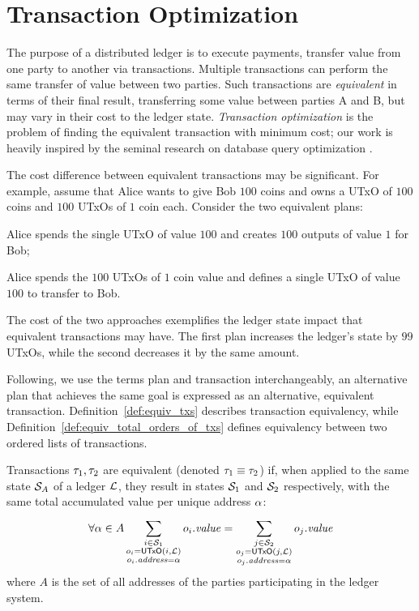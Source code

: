 \section{Transaction Optimization}\label{sec:tx_optimization}

The purpose of a distributed ledger is to execute payments, \ie transfer value
from one party to another via transactions.  Multiple transactions can perform
the same transfer of value between two parties. Such transactions are
\emph{equivalent} in terms of their final result, \ie transferring some value
between parties A and B, but may vary in their cost to the ledger state.
\emph{Transaction optimization} is the problem of finding the equivalent
transaction with minimum cost; our work is heavily inspired by the seminal
research on database query optimization \cite{ioannidis}.

The cost difference between equivalent transactions may be significant.
For example, assume that Alice wants to give Bob $100$ coins and owns a UTxO of
$100$ coins and $100$ UTxOs of $1$ coin each. Consider the two equivalent
plans:
\begin{inparaenum}[1)]
    \item Alice spends the single UTxO of value $100$ and
        creates $100$ outputs of value $1$ for Bob;
    \item Alice spends the $100$ UTxOs of $1$ coin value and
        defines a single UTxO of value $100$ to transfer to Bob.
\end{inparaenum}
The cost of the two approaches exemplifies the ledger state impact that
equivalent transactions may have. The first plan increases the ledger's state
by $99$ UTxOs, while the second decreases it by the same amount.

Following, we use the terms plan and transaction interchangeably, \ie an
alternative plan that achieves the same goal is expressed as an alternative,
equivalent transaction. Definition~\ref{def:equiv_txs} describes transaction
equivalency, while Definition~\ref{def:equiv_total_orders_of_txs} defines
equivalency between two ordered lists of transactions.

\begin{definition}\label{def:equiv_txs}
    Transactions $\tau_1, \tau_2$ are equivalent (denoted $\tau_1
    \equiv \tau_2$) if, when applied to the same state $\mathcal{S}_A$
    of a ledger $\mathcal{L}$, they result in states $\mathcal{S}_1$ and
    $\mathcal{S}_2$ respectively, with the same total accumulated value per unique
    address $\alpha$:
    \[
    \forall \alpha \in A
        \sum_{\substack{i \in \mathcal{S}_1 \\ o_i = \mathsf{UTxO}(i, \mathcal{L}) \\
        o_i.\mathit{address} =
        \alpha }}^{} o_i.\mathit{value} =
        \sum_{\substack{ j \in \mathcal{S}_2 \\ o_j = \mathsf{UTxO}(j, \mathcal{L}) \\
        o_j.\mathit{address} =
        \alpha }}^{} o_j.\mathit{value}
    \]
    where $A$ is the set of all addresses of the parties participating in the
    ledger system.
\end{definition}

